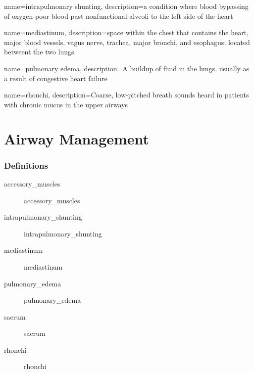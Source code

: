 \documentclass[../../EMT-169.tex]{subfiles}
\begin{document}
\setcounter{chapter}{9}
\label{ch:chapter10}
\clearpage
	


	{
		name=intrapulmonary shunting,
		description={a condition where blood bypassing of oxygen-poor blood past nonfunctional alveoli to the left side of the heart}
	}

	{
		name=mediastinum,
		description={space within the chest that contains the heart, major blood vessels, vagus nerve, trachea, major bronchi, and esophagus; located betweent the two lungs}
	}

	{
		name=pulmonary edema,
		description={A buildup of fluid in the lungs, usually as a result of congestive heart failure}
	}


	{
		name=rhonchi,
		description={Coarse, low-pitched breath sounds heard in patients with chronic mucus in the upper airways}
	}

	
\chapter{Airway Management}

\subsection*{Definitions}
\begin{description}	
	\item [\gls{accessory_muscles}] 				\glsdesc{accessory_muscles}
	\item [\gls{intrapulmonary_shunting}] 			\glsdesc{intrapulmonary_shunting}
	\item [\gls{mediastinum}] 						\glsdesc{mediastinum}
	\item [\gls{pulmonary_edema}] 					\glsdesc{pulmonary_edema}
	\item [\gls{sacrum}] 							\glsdesc{sacrum}
	\item [\gls{rhonchi}] 							\glsdesc{rhonchi}
\end{description}\hfill \\
\end{document}
